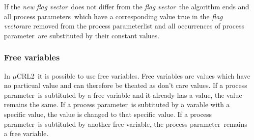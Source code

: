 \documentclass[a4paper,10pt]{article}
\newcommand{\mcrl}{$\mu$CRL2}
\newcommand{\pp}{process parameter}
\newcommand{\pps}{process parameters}
\newcommand{\ti}{\textit}
\newcommand{\fv}{\textit{flag vector}}
\begin{document}
If the \ti{new} \fv\ does not differ from the \fv\ the algorithm ends and all \pps\ which have a corresponding value true in the \fv are removed from the \pp list and all occurrences of \pp\ are substituted by their constant values.

\subsubsection{Free variables}
In \mcrl\ it is possible to use free variables. Free variables are values which have no particual value and can therefore be theated as don't care values. If a \pp\ is subtituted by a free variable and it already has a value, the value remains the same. If a \pp\ is subtituted by a varable with a specific value, the value is changed to that specific value. If a \pp\ is subtituted by another free variable, the \pp\ remains a free variable. 
\end{document}
